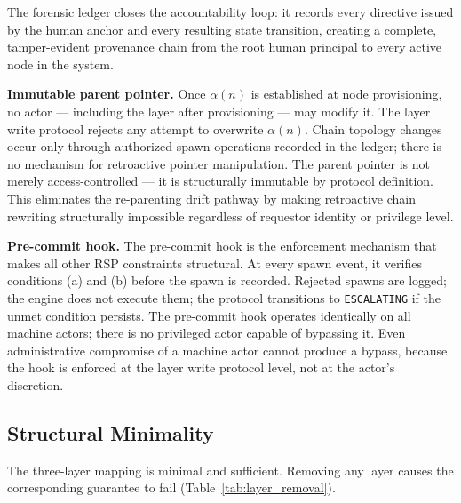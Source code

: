 The forensic ledger closes the accountability loop: it records every directive issued by the human anchor and every resulting state transition, creating a complete, tamper-evident provenance chain from the root human principal to every active node in the system.

\medskip
\noindent\textbf{Immutable parent pointer.} Once $\alpha(n)$ is established at node provisioning, no actor --- including the \purpose{} layer after provisioning --- may modify it. The \fact{} layer write protocol rejects any attempt to overwrite $\alpha(n)$. Chain topology changes occur only through authorized spawn operations recorded in the ledger; there is no mechanism for retroactive pointer manipulation. The parent pointer is not merely access-controlled --- it is structurally immutable by protocol definition. This eliminates the re-parenting drift pathway by making retroactive chain rewriting structurally impossible regardless of requestor identity or privilege level.

\medskip
\noindent\textbf{Pre-commit hook.} The pre-commit hook is the enforcement mechanism that makes all other RSP constraints structural. At every spawn event, it verifies conditions (a) and (b) before the spawn is recorded. Rejected spawns are logged; the \bounds{} engine does not execute them; the protocol transitions to \texttt{ESCALATING} if the unmet condition persists. The pre-commit hook operates identically on all machine actors; there is no privileged actor capable of bypassing it. Even administrative compromise of a machine actor cannot produce a bypass, because the hook is enforced at the \fact{} layer write protocol level, not at the actor's discretion.

\subsection{Structural Minimality}
\label{sec:minimality}

The three-layer mapping is minimal and sufficient. Removing any layer causes the corresponding guarantee to fail (Table~\ref{tab:layer_removal}).

